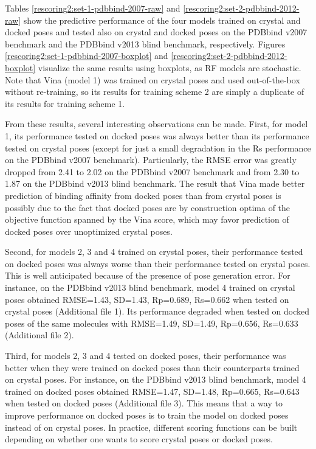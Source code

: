 \documentclass[twocolumn]{bmcart}
\begin{document}
Tables \ref{rescoring2:set-1-pdbbind-2007-raw} and \ref{rescoring2:set-2-pdbbind-2012-raw} show the predictive performance of the four models trained on crystal and docked poses and tested also on crystal and docked poses on the PDBbind v2007 benchmark and the PDBbind v2013 blind benchmark, respectively. Figures \ref{rescoring2:set-1-pdbbind-2007-boxplot} and \ref{rescoring2:set-2-pdbbind-2012-boxplot} visualize the same results using boxplots, as RF models are stochastic. Note that Vina (model 1) was trained on crystal poses and used out-of-the-box without re-training, so its results for training scheme 2 are simply a duplicate of its results for training scheme 1.

From these results, several interesting observations can be made. First, for model 1, its performance tested on docked poses was always better than its performance tested on crystal poses (except for just a small degradation in the Rs performance on the PDBbind v2007 benchmark). Particularly, the RMSE error was greatly dropped from 2.41 to 2.02 on the PDBbind v2007 benchmark and from 2.30 to 1.87 on the PDBbind v2013 blind benchmark. The result that Vina made better prediction of binding affinity from docked poses than from crystal poses is possibly due to the fact that docked poses are by construction optima of the objective function spanned by the Vina score, which may favor prediction of docked poses over unoptimized crystal poses.

Second, for models 2, 3 and 4 trained on crystal poses, their performance tested on docked poses was always worse than their performance tested on crystal poses. This is well anticipated because of the presence of pose generation error. For instance, on the PDBbind v2013 blind benchmark, model 4 trained on crystal poses obtained RMSE=1.43, SD=1.43, Rp=0.689, Rs=0.662 when tested on crystal poses (Additional file 1). Its performance degraded when tested on docked poses of the same molecules with RMSE=1.49, SD=1.49, Rp=0.656, Rs=0.633 (Additional file 2).

Third, for models 2, 3 and 4 tested on docked poses, their performance was better when they were trained on docked poses than their counterparts trained on crystal poses. For instance, on the PDBbind v2013 blind benchmark, model 4 trained on docked poses obtained RMSE=1.47, SD=1.48, Rp=0.665, Rs=0.643 when tested on docked poses (Additional file 3). This means that a way to improve performance on docked poses is to train the model on docked poses instead of on crystal poses. In practice, different scoring functions can be built depending on whether one wants to score crystal poses or docked poses.
\end{document}
